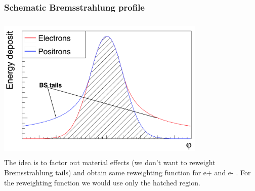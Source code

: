 \documentclass{beamer}
\begin{document}
\begin{frame}
\frametitle{Schematic Bremsstrahlung profile}
\centering
\includegraphics[width=10cm,height=7cm]{bs_tails.png}\\
The idea is to factor out material effects (we don't want to reweight Bremsstrahlung tails) and obtain same reweighting function for e+ and e- . For the reweighting function we would use only the hatched region.
\end{frame}

\end{document}
